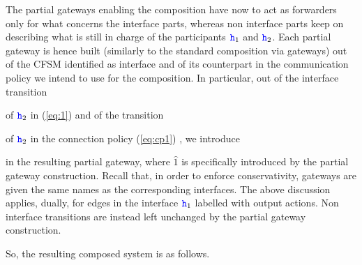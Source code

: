 The partial gateways enabling the composition have now to act as forwarders only for what concerns the interface parts,
whereas non interface parts keep on describing what is still in charge of the participants ${\mathtt{\color{blue}{ {h}}}}_1$ and ${\mathtt{\color{blue}{ {h}}}}_2$.
Each partial gateway is hence built (similarly to the standard composition via gateways) out of 
the CFSM identified as interface and of  its counterpart in the
communication policy we intend to use for the composition. 
 \vspace{-1mm} In particular, out of the interface transition
\raisebox{2mm}
{
 } 
 of ${\mathtt{\color{blue}{ {h}}}}_2$ in (\ref{eq:1}) and of the transition
 \raisebox{2mm}
{
 }  
 of ${\mathtt{\color{blue}{ {h}}}}_2$ in the connection policy (\ref{eq:cp1}) , we introduce 
  \raisebox{2mm}
{
 }
in the resulting partial gateway, where $\widehat 1$ is specifically introduced 
by the partial gateway construction.
Recall that, in order to enforce conservativity, gateways are given the same names as the
corresponding interfaces.
The above discussion applies, dually, for edges in the interface ${\mathtt{\color{blue}{ {h}}}}_1$ labelled with output actions.
Non interface transitions are instead left unchanged by the partial gateway construction.



So, the resulting composed system is as follows.

